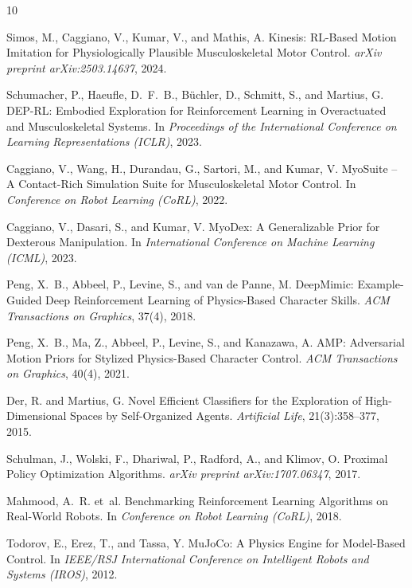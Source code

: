 \documentclass[10pt,twocolumn]{article}
\begin{document}

\begin{thebibliography}{10}

Simos, M., Caggiano, V., Kumar, V., and Mathis, A.
\newblock Kinesis: RL-Based Motion Imitation for Physiologically Plausible Musculoskeletal Motor Control.
\newblock \emph{arXiv preprint arXiv:2503.14637}, 2024.

Schumacher, P., Haeufle, D.~F.~B., B{\"u}chler, D., Schmitt, S., and Martius, G.
\newblock DEP-RL: Embodied Exploration for Reinforcement Learning in Overactuated and Musculoskeletal Systems.
\newblock In \emph{Proceedings of the International Conference on Learning Representations (ICLR)}, 2023.

Caggiano, V., Wang, H., Durandau, G., Sartori, M., and Kumar, V.
\newblock MyoSuite -- A Contact-Rich Simulation Suite for Musculoskeletal Motor Control.
\newblock In \emph{Conference on Robot Learning (CoRL)}, 2022.

Caggiano, V., Dasari, S., and Kumar, V.
\newblock MyoDex: A Generalizable Prior for Dexterous Manipulation.
\newblock In \emph{International Conference on Machine Learning (ICML)}, 2023.

Peng, X.~B., Abbeel, P., Levine, S., and van de Panne, M.
\newblock DeepMimic: Example-Guided Deep Reinforcement Learning of Physics-Based Character Skills.
\newblock \emph{ACM Transactions on Graphics}, 37(4), 2018.

Peng, X.~B., Ma, Z., Abbeel, P., Levine, S., and Kanazawa, A.
\newblock AMP: Adversarial Motion Priors for Stylized Physics-Based Character Control.
\newblock \emph{ACM Transactions on Graphics}, 40(4), 2021.

Der, R. and Martius, G.
\newblock Novel Efficient Classifiers for the Exploration of High-Dimensional Spaces by Self-Organized Agents.
\newblock \emph{Artificial Life}, 21(3):358--377, 2015.

Schulman, J., Wolski, F., Dhariwal, P., Radford, A., and Klimov, O.
\newblock Proximal Policy Optimization Algorithms.
\newblock \emph{arXiv preprint arXiv:1707.06347}, 2017.

Mahmood, A.~R. et~al.
\newblock Benchmarking Reinforcement Learning Algorithms on Real-World Robots.
\newblock In \emph{Conference on Robot Learning (CoRL)}, 2018.

Todorov, E., Erez, T., and Tassa, Y.
\newblock MuJoCo: A Physics Engine for Model-Based Control.
\newblock In \emph{IEEE/RSJ International Conference on Intelligent Robots and Systems (IROS)}, 2012.

\end{thebibliography}
\end{document}
